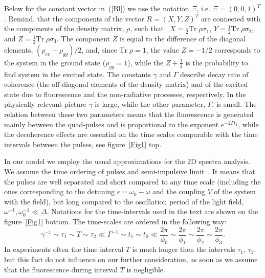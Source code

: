 \documentclass[prb,twocolumn,showpacs,epsfig,epsf]{revtex4}
\newcommand{\tr}{\textrm{Tr}\;}
\newcommand{\1}{\mathds{1}}
\begin{document}
Below for the constant vector in~(\ref{Bl}) we use the notation $\Xi$, i.e. $\Xi=\left( 0,0,1\right)^T$. Remind, that the components of the vector $R=(X,Y,Z)^T$ are connected with the components of the density matrix, $\rho$, such that~\cite{Pauli}  $X=\frac{1}{2}\tr \rho\sigma_1$, $Y=\frac{1}{2}\tr \rho\sigma_2$, and $Z=\frac{1}{2}\tr \rho\sigma_3$. The component $Z$ is equal to the difference of the diagonal elements, $(\rho_{ee}-\rho_{gg})/2$, and, since $\tr\rho=1$, the value $Z=-1/2$ corresponds to the system in the ground state ($\rho_{gg}=1$), while the $Z+\frac{1}{2}$ is the probability to find system in the excited state. The constants $\gamma$ and $\Gamma$ describe decay rate of coherence (the off-diagonal elements of the density matrix) and of the excited state due to fluorescence and the non-radiative processes, respectively. In the physically relevant picture $\gamma$ is large, while the other parameter, $\Gamma$, is small.  %
The relation between these two parameters means that the fluorescence is generated mainly between the quad-pulses and is proportional to the exponent $e^{-2\Gamma t_1}$, while the decoherence effects are essential on the time scales comparable with the time intervals between the pulses, see figure~\ref{Fig1} top. 

In our model we employ the usual approximations for the 2D spectra analysis. We assume the time ordering of pulses and semi-impulsive limit~\cite{Mbook}. It means that the pulses are well separated and short compared to any time scale (including the ones corresponding to the detuning $\epsilon=\omega_0-\omega$ and the coupling $V$ of the system with the field), but long compared to the oscillation period of the light field, $\omega^{-1},\omega_0^{-1}\ll \Delta$. Notations for the time-intervals used in the text are shown on the figure~\ref{Fig1} bottom. The time-scales are ordered in the following way:
{\small \begin{equation}
\gamma^{-1}\sim\tau_1\sim T\sim\tau_2\nonumber \ll\Gamma^{-1}\sim t_1\sim t_0\ll \frac{2\pi}{\phi_0}\sim\frac{2\pi}{\phi_1}\sim\frac{2\pi}{\phi_2}\sim\frac{2\pi}{\phi_3}.
\end{equation}}
In experiments often the time interval $T$ is much longer then the intervals $\tau_1$, $\tau_2$, but this fact do not influence on our further consideration, as soon as we assume that the fluorescence during interval $T$ is negligible.
\end{document}
